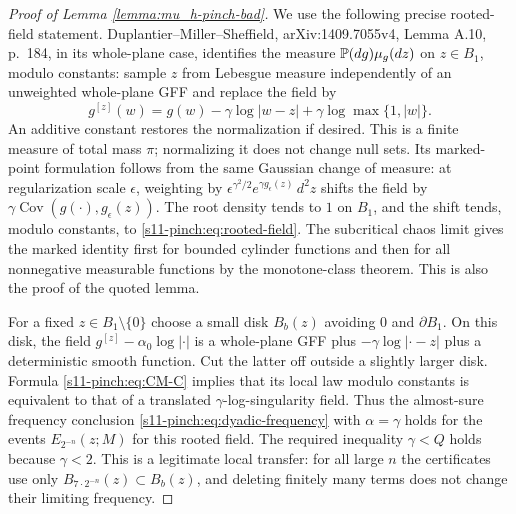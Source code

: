 \documentclass[12pt]{amsart}
\numberwithin{equation}{section}
\begin{document}
\begin{proof}[Proof of Lemma \ref{lemma:mu_h-pinch-bad}]
We use the following precise rooted-field statement.
Duplantier--Miller--Sheffield, arXiv:1409.7055v4,
Lemma A.10, p.~184, in its whole-plane case, identifies the
measure $\P(dg)\mu_g(dz)$ on $z\in B_1$, modulo constants:
sample $z$ from Lebesgue measure independently of an unweighted
whole-plane GFF and replace the field by
\begin{equation}\label{s11-pinch:eq:rooted-field}
 g^{[z]}(w)=g(w)-\gamma\log|w-z|
                         +\gamma\log\max\{1,|w|\}.
\end{equation}
An additive constant restores the normalization if desired.
This is a finite measure of total mass $\pi$; normalizing it
does not change null sets. Its marked-point formulation follows
from the same Gaussian change of measure: at regularization
scale $\epsilon$, weighting by
$\epsilon^{\gamma^2/2}e^{\gamma g_\epsilon(z)}\,d^2z$
shifts the field by
$\gamma\operatorname{Cov}(g(\cdot),g_\epsilon(z))$.
The root density tends to $1$ on $B_1$, and the shift tends,
modulo constants, to \eqref{s11-pinch:eq:rooted-field}.
The subcritical chaos limit gives the marked identity first
for bounded cylinder functions and then for all nonnegative
measurable functions by the monotone-class theorem. This is
also the proof of the quoted lemma.

For a fixed $z\in B_1\setminus\{0\}$ choose a small disk
$B_b(z)$ avoiding $0$ and $\partial B_1$. On this disk,
the field
$g^{[z]}-\alpha_0\log|\cdot|$ is a whole-plane GFF plus
$-\gamma\log|\cdot-z|$ plus a deterministic smooth function.
Cut the latter off outside a slightly larger disk.
Formula \eqref{s11-pinch:eq:CM-C} implies that its local law modulo
constants is equivalent to that of a translated
$\gamma$-log-singularity field. Thus the almost-sure frequency
conclusion \eqref{s11-pinch:eq:dyadic-frequency} with $\alpha=\gamma$
holds for the events $E_{2^{-n}}(z;M)$ for this rooted field.
The required inequality $\gamma<Q$ holds because $\gamma<2$.
This is a legitimate local transfer: for all large $n$ the
certificates use only $B_{7\cdot2^{-n}}(z)\subset B_b(z)$,
and deleting finitely many terms does not change their
limiting frequency.


\end{proof}
\end{document}
